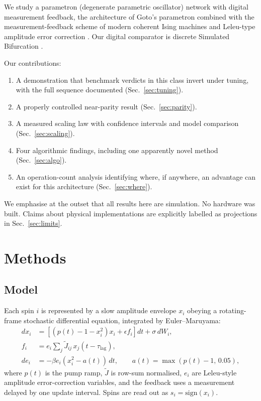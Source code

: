 \documentclass[11pt]{article}
\begin{document}
We study a parametron (degenerate parametric oscillator) network with digital
measurement feedback, the architecture of Goto's parametron \cite{goto1959}
combined with the measurement-feedback scheme of modern coherent Ising machines
\cite{inagaki2016,honjo2021} and Leleu-type amplitude error correction
\cite{leleu2019}. Our digital comparator is discrete Simulated Bifurcation
\cite{goto2019,goto2021}.

Our contributions:
\begin{enumerate}
\item A demonstration that benchmark verdicts in this class invert under tuning,
      with the full sequence documented (Sec.~\ref{sec:tuning}).
\item A properly controlled near-parity result (Sec.~\ref{sec:parity}).
\item A measured scaling law with confidence intervals and model comparison
      (Sec.~\ref{sec:scaling}).
\item Four algorithmic findings, including one apparently novel method
      (Sec.~\ref{sec:algo}).
\item An operation-count analysis identifying where, if anywhere, an advantage
      can exist for this architecture (Sec.~\ref{sec:where}).
\end{enumerate}

We emphasise at the outset that all results here are simulation. No hardware was
built. Claims about physical implementations are explicitly labelled as
projections in Sec.~\ref{sec:limits}.

\section{Methods}

\subsection{Model}
Each spin $i$ is represented by a slow amplitude envelope $x_i$ obeying a
rotating-frame stochastic differential equation, integrated by Euler--Maruyama:
\begin{align}
dx_i &= \left[(p(t)-1-x_i^2)x_i + \epsilon f_i\right]dt + \sigma\,dW_i,\\
f_i  &= e_i \sum_j \tilde J_{ij}\,x_j(t-\tau_{\text{lag}}),\\
de_i &= -\beta e_i (x_i^2 - a(t))\,dt, \qquad a(t)=\max(p(t)-1,\,0.05),
\end{align}
where $p(t)$ is the pump ramp, $\tilde J$ is row-sum normalised, $e_i$ are
Leleu-style amplitude error-correction variables, and the feedback uses a
measurement delayed by one update interval. Spins are read out as
$s_i=\mathrm{sign}(x_i)$.
\end{document}
